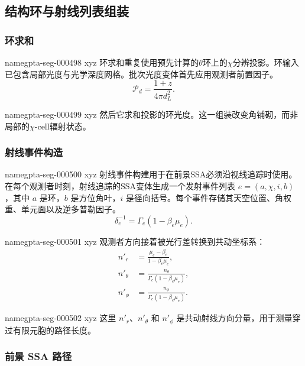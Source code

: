 \documentclass[twocolumn]{aastex702}
\makeatletter
\providecommand{\gptareaderanchor}[1]{\pdfdest name{#1} xyz}%
\providecommand{\gptareaderanchor}[1]{\special{pdf:dest (#1) [ @thispage /XYZ @xpos @ypos null ]}}%
\makeatother
\begin{document}
\subsection{结构环与射线列表组装}

\subsubsection{环求和}


\gptareaderanchor{gpta-seg-000498}%
环求和重复使用预先计算的\(\theta\)环上的\(\chi\)分辨投影。环输入已包含局部光度与光学深度网格。批次光度变体首先应用观测者前置因子。
\begin{equation}
\mathcal{P}_d=\frac{1+z}{4\pi d_L^2}.
\end{equation}

\gptareaderanchor{gpta-seg-000499}%
然后它求和投影的环光度。这一组装改变角铺砌，而非局部的\(\chi\)-cell辐射状态。

\subsubsection{射线事件构造}


\gptareaderanchor{gpta-seg-000500}%
射线事件构建用于在前景SSA必须沿视线追踪时使用。在每个观测者时刻，射线追踪的SSA变体生成一个发射事件列表 \(e=(a,\chi,i,b)\)，其中 \(a\) 是环，\(b\) 是方位角叶，\(i\) 是径向括号。每个事件存储其天空位置、角权重、单元面以及逆多普勒因子。
\begin{equation}
\delta_e^{-1}=\Gamma_e(1-\beta_e\mu_e).
\end{equation}

\gptareaderanchor{gpta-seg-000501}%
观测者方向接着被光行差转换到共动坐标系：
\begin{equation}
\begin{aligned}
n'_r&=\frac{\mu_e-\beta_e}{1-\beta_e\mu_e},\\
n'_\theta&=\frac{n_\theta}{\Gamma_e(1-\beta_e\mu_e)},\\
n'_\phi&=\frac{n_\phi}{\Gamma_e(1-\beta_e\mu_e)}.
\end{aligned}
\end{equation}

\gptareaderanchor{gpta-seg-000502}%
这里 \(n'_r\)、\(n'_\theta\) 和 \(n'_\phi\) 是共动射线方向分量，用于测量穿过有限元胞的路径长度。

\subsubsection{前景 SSA 路径}
\end{document}

